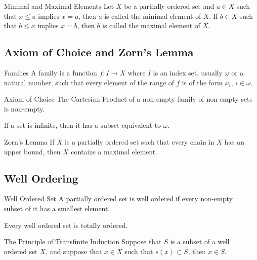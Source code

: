 \documentclass[a4paper]{article}
\begin{document}
\begin{defn}{Minimal and Maximal Elements}{} Let $X$ be a partially ordered set and $a\in X$ such that $x\leq a$ implies $x=a$, then $a$ is called the minimal element of $X$. If $b\in X$ such that $b\leq x$ implies $x=b$, then $b$ is called the maximal element of $X$. 
\end{defn}

\subsection{Axiom of Choice and Zorn's Lemma}
\begin{defn}{Families}{} A family is a function $f:I\to X$ where $I$ is an index set, usually $\omega$ or a natural number, such that every element of the range of $f$ is of the form $x_i$, $i\in\omega$. 
\end{defn}

\begin{axm}{Axiom of Choice}{} The Cartesian Product of a non-empty family of non-empty sets is non-empty. 
\end{axm}

\begin{thm}{}{} If a set is infinite, then it has a subset equivalent to $\omega$. 
\end{thm}

\begin{thm}{Zorn's Lemma}{} If $X$ is a partially ordered set such that every chain in $X$ has an upper bound, then $X$ contains a maximal element. 
\end{thm}

\subsection{Well Ordering}
\begin{defn}{Well Ordered Set}{} A partially ordered set is well ordered if every non-empty subset of it has a smallest element. 
\end{defn}

\begin{thm}{}{} Every well ordered set is totally ordered. 
\end{thm}

\begin{thm}{The Principle of Transfinite Induction}{} Suppose that $S$ is a subset of a well ordered set $X$, and suppose that $x\in X$ such that $s(x)\subset S$, then $x\in S$. 
\end{thm}
\end{document}
